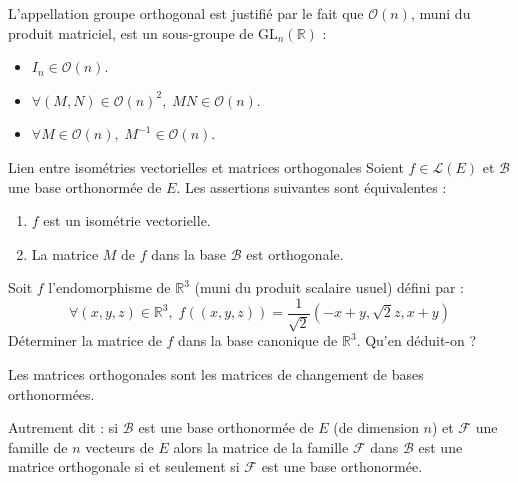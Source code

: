 \documentclass[french,11pt,twoside]{VcCours}
\begin{document}
L'appellation groupe orthogonal est justifié par le fait que $\mathcal{O}(n)$, muni du produit matriciel, est un sous-groupe de $\textrm{GL}_n(\mathbb{R})$ :

\begin{Proposition}{} 
\begin{itemize}
\item $I_n \in \mathcal{O}(n)$.
\item $\forall (M,N) \in \mathcal{O}(n)^2, \; MN \in \mathcal{O}(n)$.
\item $\forall M \in \mathcal{O}(n), \; M^{-1} \in \mathcal{O}(n)$.
\end{itemize}
\end{Proposition}

\begin{Demonstration}{}
\vspace*{5cm}
\end{Demonstration}

\begin{Proposition}{Lien entre isométries vectorielles et matrices orthogonales}
Soient $f \in \mathcal{L}(E)$ et $\mathcal{B}$ une base orthonormée de $E$.  Les assertions suivantes sont équivalentes :
\begin{enumerate}
\item $f$ est un isométrie vectorielle.
\item La matrice $M$ de $f$ dans la base $\mathcal{B}$ est orthogonale.
\end{enumerate}
\end{Proposition}

\begin{Demonstration}{}
\vspace*{5cm}
\end{Demonstration}

\begin{Exemple}{} Soit $f$ l'endomorphisme de $\mathbb{R}^3$ (muni du produit scalaire usuel) défini par :
$$ \forall (x,y,z) \in \mathbb{R}^3, \; f((x,y,z)) = \dfrac{1}{\sqrt{2}} (-x+y , \sqrt{2}z, x+y)$$
Déterminer la matrice de $f$ dans la base canonique de $\mathbb{R}^3$. Qu'en déduit-on ?


\vspace*{5cm}

\end{Exemple}

\begin{Proposition}{} Les matrices orthogonales sont les matrices de changement de bases orthonormées. 

Autrement dit : si $\mathcal{B}$ est une base orthonormée de $E$ (de dimension $n$) et $\mathcal{F}$ une famille de $n$ vecteurs de $E$ alors la matrice de la famille $\mathcal{F}$ dans $\mathcal{B}$ est une matrice orthogonale si et seulement si $\mathcal{F}$ est une base orthonormée.
\end{Proposition}
\end{document}
